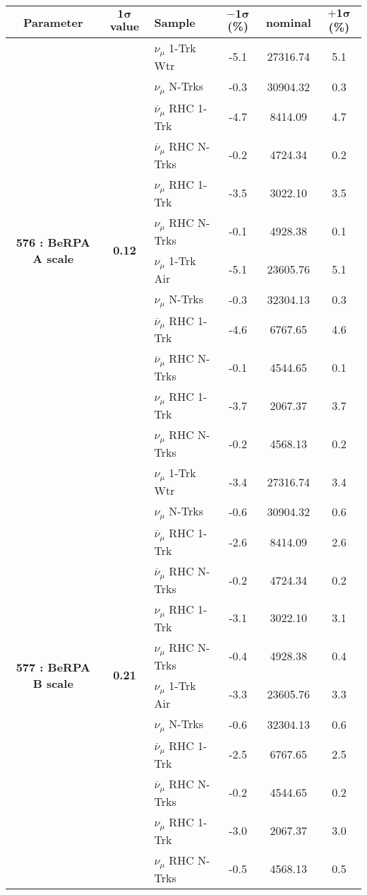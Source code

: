 \addtocounter{table}{-1}
\begin{table}[ht!]
\centering

\begin{tabular}{ c  c  l  c  c  c }
\midrule[1.3pt]
\textbf{Parameter} & \textbf{$\mathbf{1\sigma}$ value} & \textbf{Sample} & \textbf{$\mathbf{-1\sigma}$ (\%)}  &  \textbf{nominal}  &  \textbf{$\mathbf{+1\sigma}$ (\%)} \\
\midrule[1.3pt]
\multirow{12}{*}{\textbf{576 : BeRPA A scale}} & \multirow{12}{*}{\textbf{0.12}} & $\nu_\mu$ 1-Trk Wtr &   -5.1 &  27316.74 &   5.1 \\ 
 &  & $\nu_\mu$ N-Trks &   -0.3 &  30904.32 &   0.3 \\ 
 &  & $\overline{\nu}_\mu$ RHC 1-Trk &   -4.7 &  8414.09 &   4.7 \\ 
 &  & $\overline{\nu}_\mu$ RHC N-Trks &   -0.2 &  4724.34 &   0.2 \\ 
 &  & $\nu_\mu$ RHC 1-Trk &   -3.5 &  3022.10 &   3.5 \\ 
 &  & $\nu_\mu$ RHC N-Trks &   -0.1 &  4928.38 &   0.1 \\ 
 &  & $\nu_\mu$ 1-Trk Air &   -5.1 &  23605.76 &   5.1 \\ 
 &  & $\nu_\mu$ N-Trks &   -0.3 &  32304.13 &   0.3 \\ 
 &  & $\overline{\nu}_\mu$ RHC 1-Trk &   -4.6 &  6767.65 &   4.6 \\ 
 &  & $\overline{\nu}_\mu$ RHC N-Trks &   -0.1 &  4544.65 &   0.1 \\ 
 &  & $\nu_\mu$ RHC 1-Trk &   -3.7 &  2067.37 &   3.7 \\ 
 &  & $\nu_\mu$ RHC N-Trks &   -0.2 &  4568.13 &   0.2 \\ 
\midrule[1.3pt]
\multirow{12}{*}{\textbf{577 : BeRPA B scale}} & \multirow{12}{*}{\textbf{0.21}} & $\nu_\mu$ 1-Trk Wtr &   -3.4 &  27316.74 &   3.4 \\ 
 &  & $\nu_\mu$ N-Trks &   -0.6 &  30904.32 &   0.6 \\ 
 &  & $\overline{\nu}_\mu$ RHC 1-Trk &   -2.6 &  8414.09 &   2.6 \\ 
 &  & $\overline{\nu}_\mu$ RHC N-Trks &   -0.2 &  4724.34 &   0.2 \\ 
 &  & $\nu_\mu$ RHC 1-Trk &   -3.1 &  3022.10 &   3.1 \\ 
 &  & $\nu_\mu$ RHC N-Trks &   -0.4 &  4928.38 &   0.4 \\ 
 &  & $\nu_\mu$ 1-Trk Air &   -3.3 &  23605.76 &   3.3 \\ 
 &  & $\nu_\mu$ N-Trks &   -0.6 &  32304.13 &   0.6 \\ 
 &  & $\overline{\nu}_\mu$ RHC 1-Trk &   -2.5 &  6767.65 &   2.5 \\ 
 &  & $\overline{\nu}_\mu$ RHC N-Trks &   -0.2 &  4544.65 &   0.2 \\ 
 &  & $\nu_\mu$ RHC 1-Trk &   -3.0 &  2067.37 &   3.0 \\ 
 &  & $\nu_\mu$ RHC N-Trks &   -0.5 &  4568.13 &   0.5 \\ 
\midrule[1.3pt]
\end{tabular}
\end{table}
